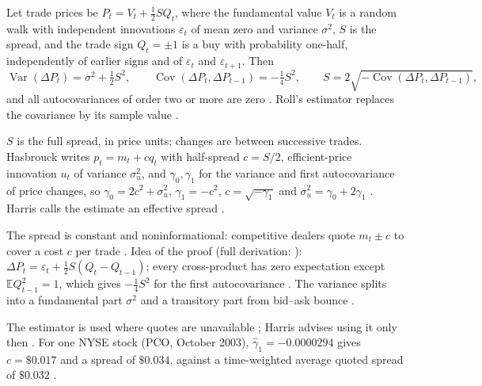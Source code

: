 \begin{qfresult}\label{res:roll-spread-estimator}
 Let trade prices be $P_t=V_t+\tfrac12SQ_t$, where the fundamental value $V_t$ is a random walk with independent innovations $\varepsilon_t$ of mean zero and variance $\sigma^2$, $S$ is the spread, and the trade sign $Q_t=\pm1$ is a buy with probability one-half, independently of earlier signs and of $\varepsilon_t$ and $\varepsilon_{t+1}$. Then \citep[chap.~``Volatility'', box, p.~415]{alpha-harris}
\[ \operatorname{Var}(\Delta P_t)=\sigma^2+\tfrac12S^2, \qquad \operatorname{Cov}(\Delta P_t,\Delta P_{t-1})=-\tfrac14S^2, \qquad S=2\sqrt{-\operatorname{Cov}(\Delta P_t,\Delta P_{t-1})}, \]
and all autocovariances of order two or more are zero \citep[sec.~3.4, p.~30]{s6-hasbrouck}. Roll's estimator replaces the covariance by its sample value \citep[chap.~``Volatility'', p.~415]{alpha-harris}.

 $S$ is the full spread, in price units; changes are between successive trades. Hasbrouck writes $p_t=m_t+cq_t$ with half-spread $c=S/2$, efficient-price innovation $u_t$ of variance $\sigma_u^2$, and $\gamma_0,\gamma_1$ for the variance and first autocovariance of price changes, so $\gamma_0=2c^2+\sigma_u^2$, $\gamma_1=-c^2$, $c=\sqrt{-\gamma_1}$ and $\sigma_u^2=\gamma_0+2\gamma_1$ \citep[sec.~3.4, eqs.~(3.3)--(3.5), pp.~29--30]{s6-hasbrouck}. Harris calls the estimate an effective spread \citep[chap.~``Liquidity and Transaction Cost Measurement'', p.~434]{alpha-harris}.

 The spread is constant and noninformational: competitive dealers quote $m_t\pm c$ to cover a cost $c$ per trade \citep[sec.~3.4, p.~29]{s6-hasbrouck}. Idea of the proof (full derivation: ): $\Delta P_t=\varepsilon_t+\tfrac12S(Q_t-Q_{t-1})$; every cross-product has zero expectation except $\mathbb{E}Q_{t-1}^2=1$, which gives $-\tfrac14S^2$ for the first autocovariance \citep[chap.~``Volatility'', p.~415]{alpha-harris}. The variance splits into a fundamental part $\sigma^2$ and a transitory part from bid--ask bounce \citep[same chap., pp.~415--416]{alpha-harris}.

 The estimator is used where quotes are unavailable \citep[sec.~3.4, p.~30]{s6-hasbrouck}; Harris advises using it only then \citep[chap.~``Liquidity and Transaction Cost Measurement'', p.~434]{alpha-harris}. For one NYSE stock (PCO, October 2003), $\hat\gamma_1=-0.0000294$ gives $c=\$0.017$ and a spread of $\$0.034$, against a time-weighted average quoted spread of $\$0.032$ \citep[sec.~3.4, p.~30]{s6-hasbrouck}.


\end{qfresult}
